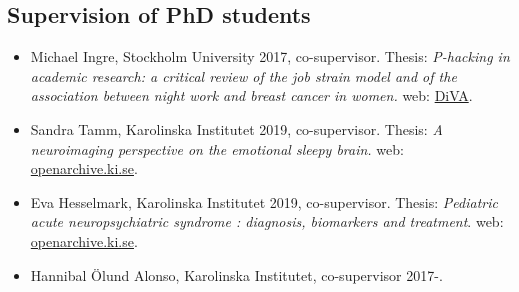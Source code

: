 \documentclass[10pt]{article}
\begin{document}
\subsection*{Supervision of PhD students}
\begin{itemize}[nolistsep]
\item Michael Ingre, Stockholm University 2017, co-supervisor. Thesis: \emph{P-hacking in academic research: a critical review of the job strain model and of the association between night work and breast cancer in women.} web: \href{http://urn.kb.se/resolve?urn=urn:nbn:se:su:diva-141136}{DiVA}.
\item Sandra Tamm, Karolinska Institutet 2019, co-supervisor. Thesis: \emph{A neuroimaging perspective on the emotional sleepy brain.} web: \href{https://openarchive.ki.se/xmlui/handle/10616/46632}{openarchive.ki.se}.
\item Eva Hesselmark, Karolinska Institutet 2019, co-supervisor. Thesis: \emph{Pediatric acute neuropsychiatric syndrome : diagnosis, biomarkers and treatment}. web: \href{https://openarchive.ki.se/xmlui/handle/10616/46741}{openarchive.ki.se}.
\item Hannibal Ölund Alonso, Karolinska Institutet, co-supervisor 2017-.
\end{itemize}
\end{document}
